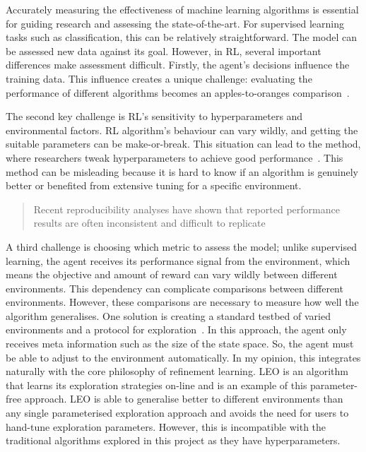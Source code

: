 \documentclass[]{final_report}
\begin{document}
Accurately measuring the effectiveness of machine learning algorithms is essential for guiding research and assessing the state-of-the-art. For supervised learning tasks such as classification, this can be relatively straightforward. The model can be assessed new data against its goal. However, in RL, several important differences make assessment difficult. Firstly, the agent's decisions influence the training data. This influence creates a unique challenge: evaluating the performance of different algorithms becomes an apples-to-oranges comparison~\cite{sutton2018reinforcement}.

The second key challenge is RL's sensitivity to hyperparameters and environmental factors. RL algorithm's behaviour can vary wildly, and getting the suitable parameters can be make-or-break. This situation can lead to the  method, where researchers tweak hyperparameters to achieve good performance~\cite{evaluatingRL}. This method can be misleading because it is hard to know if an algorithm is genuinely better or benefited from extensive tuning for a specific environment. 

\begin{quote}
  Recent reproducibility analyses have shown that reported performance results are often inconsistent and difficult to replicate~\cite{evaluatingRL}
\end{quote}

\newpage
A third challenge is choosing which metric to assess the model; unlike supervised learning, the agent receives its performance signal from the environment, which means the objective and amount of reward can vary wildly between different environments. This dependency can complicate comparisons between different environments. However, these comparisons are necessary to measure how well the algorithm generalises. One solution is creating a standard testbed of varied environments and a protocol for exploration~\cite{assessingDeepRL, evaluatingRL}. In this approach, the agent only receives meta information such as the size of the state space. So, the agent must be able to adjust to the environment automatically. In my opinion, this integrates naturally with the core philosophy of refinement learning. LEO is an algorithm that learns its exploration strategies on-line and is an example of this parameter-free approach\cite{parameterFreeExploration}. LEO is able to generalise better to different environments than any single parameterised exploration approach and avoids the need for users to hand-tune exploration parameters\cite{parameterFreeExploration}. However, this is incompatible with the traditional algorithms explored in this project as they have hyperparameters.
\end{document}
